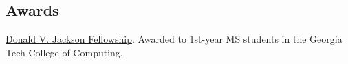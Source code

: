 \subsection*{\textbf{Awards}}
\href{https://sites.gatech.edu/gtcomputingawards2021/graduate-student-awards/}{Donald V. Jackson Fellowship}. Awarded to 1st-year MS students in the Georgia Tech College of Computing.
